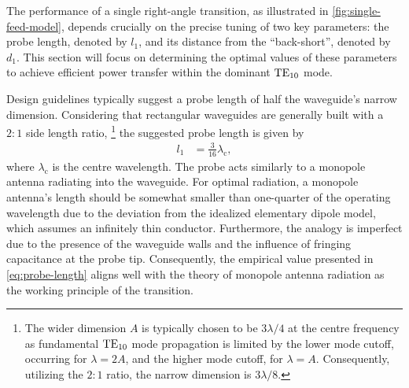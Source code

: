 \documentclass[11pt,a4paper,twoside,openany]{report}
\begin{document}
The performance of a single right-angle transition, as illustrated in \cref{fig:single-feed-model}, depends crucially on the precise tuning of two key parameters: the probe length, denoted by $l_1$, and its distance from the \enquote{back-short}, denoted by $d_1$. This section will focus on determining the optimal values of these parameters to achieve efficient power transfer within the dominant $\text{TE}_{10}$ mode.

Design guidelines typically suggest a probe length of half the waveguide's narrow dimension. Considering that rectangular waveguides are generally built with a $2:1$ side length ratio,%
    \footnote{The wider dimension $A$ is typically chosen to be $3\lambda/4$ at the centre frequency as fundamental $\text{TE}_{10}$ mode propagation is limited by the lower mode cutoff, occurring for $\lambda=2A$, and the higher mode cutoff, for $\lambda = A$. Consequently, utilizing the $2:1$ ratio, the narrow dimension is $3\lambda/8$.}
the suggested probe length is given by
\begin{align}
    \label{eq:probe-length}
    l_1 &= \frac{3}{16}\lambda_{\mathrm c},
\end{align}
where $\lambda_{\mathrm c}$ is the centre wavelength. The probe acts similarly to a monopole antenna radiating into the waveguide. For optimal radiation, a monopole antenna's length should be somewhat smaller than one-quarter of the operating wavelength due to the deviation from the idealized elementary dipole model, which assumes an infinitely thin conductor. Furthermore, the analogy is imperfect due to the presence of the waveguide walls and the influence of fringing capacitance at the probe tip. Consequently, the empirical value presented in \cref{eq:probe-length} aligns well with the theory of monopole antenna radiation as the working principle of the transition.
\end{document}
